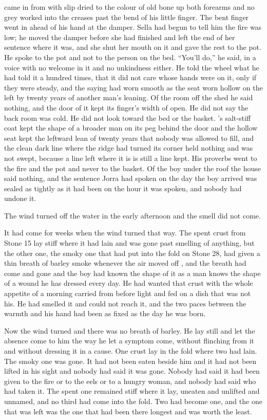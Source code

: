  came in from  with slip dried to the colour of old bone up both forearms and no grey worked into the creases past the bend of his little finger. The bent finger went in ahead of his hand at the damper. Sella had begun to tell him the fire was low; he moved the damper before she had finished and left the end of her sentence where it was, and she shut her mouth on it and gave the rest to the pot. He spoke to the pot and not to the person on the bed. “You'll do,” he said, in a voice with no welcome in it and no unkindness either. He told the wheel what he had told it a hundred times, that it did not care whose hands were on it, only if they were steady, and the saying had worn smooth as the seat worn hollow on the left by twenty years of another man's leaning. Of the room off the shed he said nothing, and the door of it kept its finger's width of open. He did not say the back room was cold. He did not look toward the bed or the basket. 's salt-stiff coat kept the shape of a broader man on its peg behind the door and the hollow seat kept the leftward lean of twenty years that nobody was allowed to fill, and the clean dark line where the ridge had turned its corner held nothing and was not swept, because a line left where it is is still a line kept. His proverbs went to the fire and the pot and never to the basket. Of the boy under the roof the house said nothing, and the sentence Jorra had spoken on the day the boy arrived was sealed as tightly as it had been on the hour it was spoken, and nobody had undone it.

\scenebreak

The wind turned off the water in the early afternoon and the smell did not come.

It had come for weeks when the wind turned that way. The spent crust from Stone 15 lay stiff where it had lain and was gone past smelling of anything, but the other one, the smoky one that  had put into the fold on Stone 28, had given a thin breath of barley smoke whenever the air moved off , and the breath had come and gone and the boy had known the shape of it as a man knows the shape of a wound he has dressed every day. He had wanted that crust with the whole appetite of a morning carried from before light and fed on a dish that was not his. He had smelled it and could not reach it, and the two paces between the warmth and his hand had been as fixed as the day he was born.

Now the wind turned and there was no breath of barley. He lay still and let the absence come to him the way he let a symptom come, without flinching from it and without dressing it in a cause. One crust lay in the fold where two had lain. The smoky one was gone. It had not been eaten beside him and it had not been lifted in his sight and nobody had said it was gone. Nobody had said it had been given to the fire or to the eels or to a hungry woman, and nobody had said who had taken it. The spent one remained stiff where it lay, uneaten and unlifted and unnamed, and no third had come into the fold. Two had become one, and the one that was left was the one that had been there longest and was worth the least.

